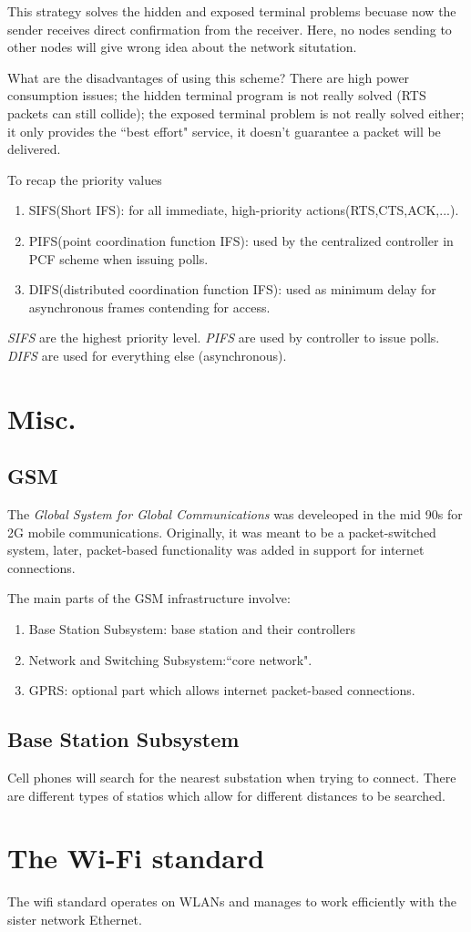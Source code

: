 \documentclass{article}
\begin{document}
This strategy solves the hidden and exposed terminal problems becuase now the sender receives direct confirmation from the 
receiver. Here, no nodes sending to other nodes will give wrong idea about the network situtation.

What are the disadvantages of using this scheme? There are high power consumption issues; the hidden terminal program is
not really solved (RTS packets can still collide); the exposed terminal problem is not really solved either; it only 
provides the ``best effort" service, it doesn't guarantee a packet will be delivered.

 To recap the priority values
\begin{enumerate}
		\item{SIFS(Short IFS)}: for all immediate, high-priority actions(RTS,CTS,ACK,...).
		\item{PIFS(point coordination function IFS)}: used by the centralized controller in PCF scheme when issuing polls.
		\item{DIFS(distributed coordination function IFS)}: used as minimum delay for asynchronous frames contending for
				access.
\end{enumerate}
\textit{SIFS} are the highest priority level.
\textit{PIFS} are used by controller to issue polls. 
\textit{DIFS} are used for everything else (asynchronous).
\section{Misc.}
\subsection{GSM}
The \textit{Global System for Global Communications} was develeoped in the mid 90s for 2G mobile communications. Originally,
it was meant to be a packet-switched system, later, packet-based functionality was added in support for internet connections.

The  main parts of the GSM infrastructure involve:
\begin{enumerate}
		\item{Base Station Subsystem}: base station and their controllers
		\item{Network and Switching Subsystem}:``core network".
		\item{GPRS}: optional part which allows internet packet-based connections.

				
\end{enumerate}
\subsection{Base Station Subsystem} 
Cell phones will search for the nearest substation when trying to connect. There are different types of statios which allow
for different distances to be searched.
\section{The Wi-Fi standard}
The wifi standard operates on WLANs and manages to work efficiently with the sister network Ethernet.
\end{document}
